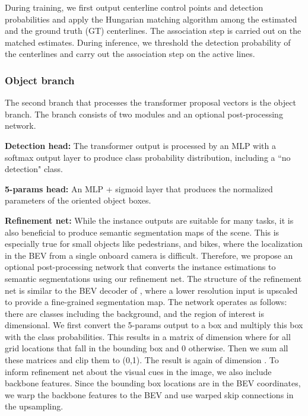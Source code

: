 \documentclass[10pt,twocolumn,letterpaper]{article}
\begin{document}
During training, we first output centerline control points and detection probabilities and apply the Hungarian matching algorithm among the estimated  and the ground truth (GT) centerlines. The association step is carried out on the matched estimates. During inference, we threshold the detection probability of the centerlines and carry out the association step on the active lines.

\subsubsection{Object branch}
The second branch that processes the transformer proposal vectors is the object branch. The branch consists of two modules and an optional post-processing network.

\noindent\textbf{Detection head:} The transformer output is processed by an MLP with a softmax output layer to produce class probability distribution, including a ``no detection" class.  

\noindent\textbf{5-params head:} An MLP + sigmoid layer that produces the normalized parameters of the oriented object boxes.

\noindent\textbf{Refinement net:} While the instance outputs are suitable for many tasks, it is also beneficial to produce semantic segmentation maps of the scene. This is especially true for small objects like pedestrians, and bikes, where the localization in the BEV from a single onboard camera is difficult. Therefore, we propose an optional post-processing network that converts the instance estimations to semantic segmentations using our refinement net. The structure of the refinement net is similar to the BEV decoder of \cite{DBLP:journals/corr/abs-2012-03040}, where a lower resolution input is upscaled to provide a fine-grained segmentation map. The network operates as follows: there are  classes including the background, and the region of interest is  dimensional. We first convert the 5-params output to a box and multiply this box with the class probabilities. This results in a matrix  of dimension  where  for all grid locations  that fall in the bounding box and 0 otherwise. Then we sum all these matrices and clip them to (0,1). The result is again of dimension . To inform refinement net about the visual cues in the image, we also include backbone features. Since the bounding box locations are in the BEV coordinates, we warp the backbone features to the BEV and use warped skip connections in the upsampling.
\end{document}
